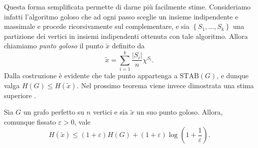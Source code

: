 Questa forma semplificata permette di darne più facilmente stime. Consideriamo infatti l'algoritmo goloso che ad ogni passo sceglie un insieme indipendente e massimale e procede ricorsivamente sul complementare, e sia \(\left\{S_1,\dots,S_k\right\}\) una partizione dei vertici in insiemi indipendenti ottenuta con tale algoritmo. Allora chiamiamo \emph{punto goloso} il punto \(\tilde{x}\) definito da
\[
  \tilde{x}=\sum_{i=1}^k\frac{|S_i|}{n}\chi^{S_i}\text{.}
\]
Dalla costruzione è evidente che tale punto appartenga a \(\text{STAB}(G)\), e dunque valga \(H(G)\le H(\tilde{x})\). Nel prossimo teorema viene invece dimostrata una stima superiore \cite{Cardinal2009}.
\begin{theorem}
   \label{greedypoint} Sia \(G\) un grafo perfetto su \(n\) vertici e sia \(\tilde{x}\) un suo punto goloso. Allora, comunque fissato \(\varepsilon>0\), vale
\[H(\tilde{x})\le(1+\varepsilon)H(G)+(1+\varepsilon)\log\left(1+\frac{1}{\varepsilon}\right).\]
\end{theorem}
